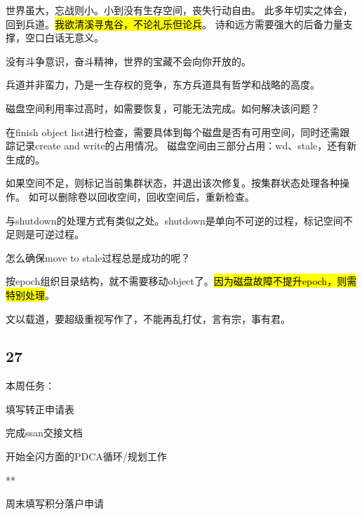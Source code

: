 世界虽大，忘战则小。小到没有生存空间，丧失行动自由。
此多年切实之体会，回到兵道。\hl{我欲清溪寻鬼谷，不论礼乐但论兵}。
诗和远方需要强大的后备力量支撑，空口白话无意义。

没有斗争意识，奋斗精神，世界的宝藏不会向你开放的。

兵道并非蛮力，乃是一生存权的竞争，东方兵道具有哲学和战略的高度。

\hrulefill

磁盘空间利用率过高时，如需要恢复，可能无法完成。如何解决该问题？

在finish object list进行检查，需要具体到每个磁盘是否有可用空间，同时还需跟踪记录create and write的占用情况。
磁盘空间由三部分占用：wd、stale，还有新生成的。

如果空间不足，则标记当前集群状态，并退出该次修复。按集群状态处理各种操作。
如可以删除卷以回收空间，回收空间后，重新检查。

与shutdown的处理方式有类似之处。shutdown是单向不可逆的过程，标记空间不足则是可逆过程。

\hrulefill

怎么确保move to stale过程总是成功的呢？

按epoch组织目录结构，就不需要移动object了。\hl{因为磁盘故障不提升epoch，则需特别处理}。

\hrulefill

文以载道，要超级重视写作了，不能再乱打仗，言有宗，事有君。

\subsection{27}

本周任务：
\begin{enumbox}
\item 填写转正申请表
\item 完成ssan交接文档
\item 开始全闪方面的PDCA循环/规划工作
\item ***
\item 周末填写积分落户申请
\end{enumbox}
